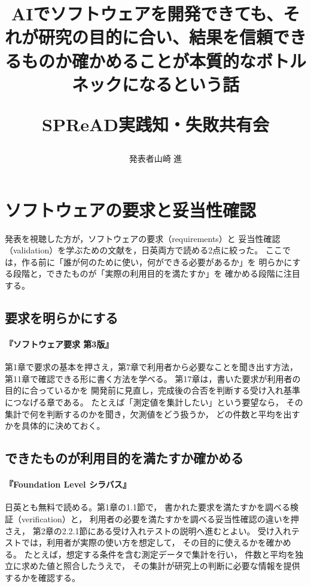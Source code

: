 \documentclass[platex]{jlreq}
\title{AIでソフトウェアを開発できても、それが研究の目的に合い、結果を信頼できるものか確かめることが本質的なボトルネックになるという話\par
       \large SPReAD実践知・失敗共有会}
\author{発表者\quad 山崎 進}
\date{}
\begin{document}
\maketitle

\section{ソフトウェアの要求と妥当性確認}

発表を視聴した方が，ソフトウェアの要求（requirements）と
妥当性確認（validation）を学ぶための文献を，日英両方で読める2点に絞った。
ここでは，作る前に「誰が何のために使い，何ができる必要があるか」を
明らかにする段階と，できたものが「実際の利用目的を満たすか」を
確かめる段階に注目する。

\subsection{要求を明らかにする}

\paragraph{『ソフトウェア要求 第3版』\cite{wiegers2014ja,wiegers2013}}
第1章で要求の基本を押さえ，第7章で利用者から必要なことを聞き出す方法，
第11章で確認できる形に書く方法を学べる。
第17章は，書いた要求が利用者の目的に合っているかを
開発前に見直し，完成後の合否を判断する受け入れ基準につなげる章である。
たとえば「測定値を集計したい」という要望なら，
その集計で何を判断するのかを聞き，欠測値をどう扱うか，
どの件数と平均を出すかを具体的に決めておく。

\subsection{できたものが利用目的を満たすか確かめる}

\paragraph{『Foundation Level シラバス』\cite{jstqb2023,istqb2024}}
日英とも無料で読める。第1章の1.1節で，
書かれた要求を満たすかを調べる検証（verification）と，
利用者の必要を満たすかを調べる妥当性確認の違いを押さえ，
第2章の2.2.1節にある受け入れテストの説明へ進むとよい。
受け入れテストでは，利用者が実際の使い方を想定して，
その目的に使えるかを確かめる。
たとえば，想定する条件を含む測定データで集計を行い，
件数と平均を独立に求めた値と照合したうえで，
その集計が研究上の判断に必要な情報を提供するかを確認する。
\end{document}
